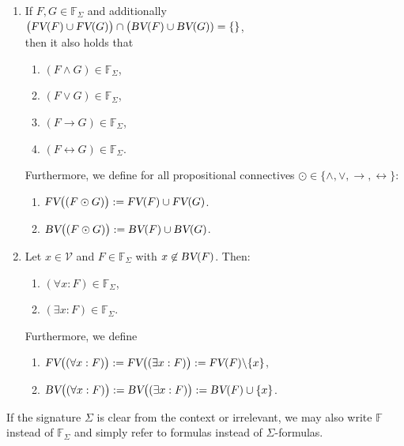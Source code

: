 \begin{Definition}
\begin{enumerate}
\begin{enumerate}
          \item $\FV\bigl( \neg F \bigr) := \FV(F)$,
          \item $\BV\bigl( \neg F \bigr) := \BV(F)$.
          \end{enumerate}
    \item If $F, G \in \mathbb{F}_\Sigma$ and additionally \\[0.2cm]
          \hspace*{1.3cm}
          $\bigl(\textsl{FV}(F) \cup \textsl{FV}(G)\bigr) \cap \bigl(\textsl{BV}(F) \cup \textsl{BV}(G)) = \{\}$,
          \\[0.2cm]
          then it also holds that
          \begin{enumerate}
          \item $(F \wedge G) \in \mathbb{F}_\Sigma$,
          \item $(F \vee G) \in \mathbb{F}_\Sigma$,
          \item $(F \rightarrow G) \in \mathbb{F}_\Sigma$,
          \item $(F \leftrightarrow G) \in \mathbb{F}_\Sigma$.
          \end{enumerate}
          Furthermore, we define for all propositional connectives $\odot \in \{ \wedge, \vee, \rightarrow, \leftrightarrow \}$:
          \begin{enumerate}
          \item $\textsl{FV}\bigl((F \odot G) \bigr) := \textsl{FV}(F) \cup \textsl{FV}(G)$.
          \item $\textsl{BV}\bigl((F \odot G) \bigr) := \textsl{BV}(F) \cup \textsl{BV}(G)$.
          \end{enumerate}
    \item Let $x \in \mathcal{V}$ and $F \in \mathbb{F}_\Sigma$ with $x \not\in \textsl{BV}(F)$. Then:
          \begin{enumerate}
          \item $(\forall x : F) \in \mathbb{F}_\Sigma$,
          \item $(\exists x : F) \in \mathbb{F}_\Sigma$.
          \end{enumerate}
          Furthermore, we define
          \begin{enumerate}
          \item $\textsl{FV}\bigl( (\forall x : F) \bigr) := \textsl{FV}\bigl( (\exists x : F) \bigr) := \textsl{FV}(F) \backslash \{x\}$,
          \item $\textsl{BV}\bigl( (\forall x : F) \bigr) := \textsl{BV}\bigl( (\exists x : F) \bigr) := \textsl{BV}(F) \cup \{x\}$.  
          \end{enumerate}
    \end{enumerate}
    If the signature $\Sigma$ is clear from the context or irrelevant, we may also write
    $\mathbb{F}$ instead of $\mathbb{F}_\Sigma$ and simply refer to formulas instead of $\Sigma$-formulas.
    \eox
\end{Definition}

